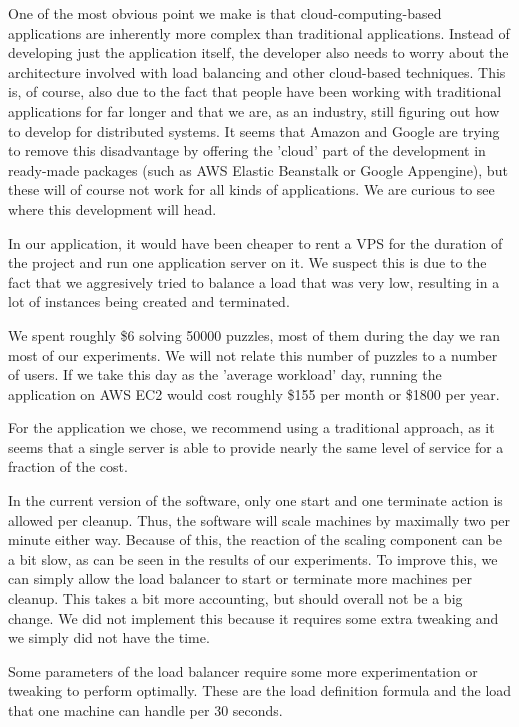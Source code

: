 One of the most obvious point we make is that cloud-computing-based applications are inherently more complex than traditional applications.
Instead of developing just the application itself, the developer also needs to worry about the architecture involved with load balancing and other cloud-based techniques.
This is, of course, also due to the fact that people have been working with traditional applications for far longer and that we are, as an industry, still figuring out how to develop for distributed systems.
It seems that Amazon and Google are trying to remove this disadvantage by offering the 'cloud' part of the development in ready-made packages (such as AWS Elastic Beanstalk or Google Appengine), but these will of course not work for all kinds of applications.
We are curious to see where this development will head.

In our application, it would have been cheaper to rent a VPS for the duration of the project and run one application server on it.
We suspect this is due to the fact that we aggresively tried to balance a load that was very low, resulting in a lot of instances being created and terminated.

We spent roughly \$6 solving 50000 puzzles, most of them during the day we ran most of our experiments.
We will not relate this number of puzzles to a number of users.
If we take this day as the 'average workload' day, running the application on AWS EC2 would cost roughly \$155 per month or \$1800 per year.

For the application we chose, we recommend using a traditional approach, as it seems that a single server is able to provide nearly the same level of service for a fraction of the cost.

In the current version of the software, only one start and one terminate action is allowed per cleanup.
Thus, the software will scale machines by maximally two per minute either way.
Because of this, the reaction of the scaling component can be a bit slow, as can be seen in the results of our experiments.
To improve this, we can simply allow the load balancer to start or terminate more machines per cleanup.
This takes a bit more accounting, but should overall not be a big change.
We did not implement this because it requires some extra tweaking and we simply did not have the time.

Some parameters of the load balancer require some more experimentation or tweaking to perform optimally.
These are the load definition formula and the load that one machine can handle per 30 seconds.
